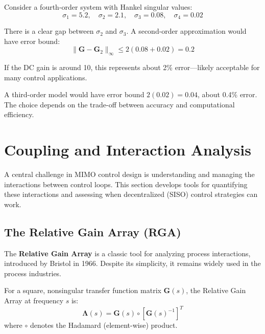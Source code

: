 \begin{example}
\label{ex:balanced_truncation}
Consider a fourth-order system with Hankel singular values:
\begin{equation}
\sigma_1 = 5.2, \quad \sigma_2 = 2.1, \quad \sigma_3 = 0.08, \quad \sigma_4 = 0.02
\end{equation}

There is a clear gap between $\sigma_2$ and $\sigma_3$. A second-order approximation would have error bound:
\begin{equation}
\|\mathbf{G} - \mathbf{G}_2\|_\infty \leq 2(0.08 + 0.02) = 0.2
\end{equation}

If the DC gain is around 10, this represents about 2\% error---likely acceptable for many control applications.

A third-order model would have error bound $2(0.02) = 0.04$, about 0.4\% error. The choice depends on the trade-off between accuracy and computational efficiency.
\end{example}


\section{Coupling and Interaction Analysis}
\label{sec:coupling_analysis}

A central challenge in MIMO control design is understanding and managing the interactions between control loops. This section develops tools for quantifying these interactions and assessing when decentralized (SISO) control strategies can work.

\subsection{The Relative Gain Array (RGA)}

The \textbf{Relative Gain Array} is a classic tool for analyzing process interactions, introduced by Bristol in 1966. Despite its simplicity, it remains widely used in the process industries.

\begin{definition}
For a square, nonsingular transfer function matrix $\mathbf{G}(s)$, the Relative Gain Array at frequency $s$ is:
\begin{equation}
\boldsymbol{\Lambda}(s) = \mathbf{G}(s) \circ [\mathbf{G}(s)^{-1}]^T
\end{equation}
where $\circ$ denotes the Hadamard (element-wise) product.
\end{definition}

